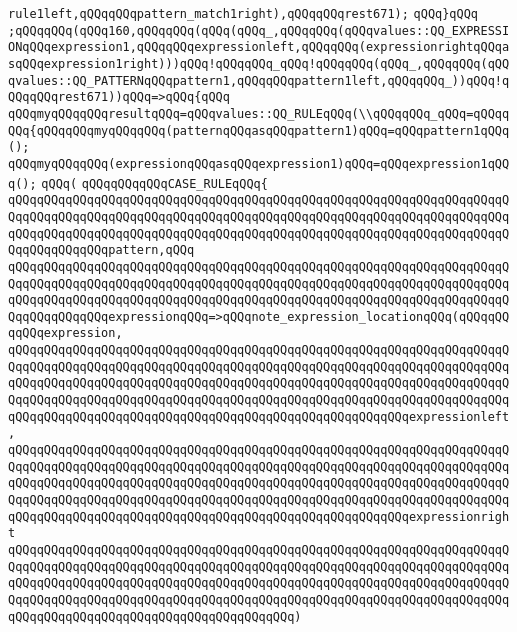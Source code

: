 \verb|rule1left,qQQqqQQqpattern_match1right),qQQqqQQqrest671);|\newline
\verb|qQQq}qQQq|\newline
\verb|;qQQqqQQq(qQQq160,qQQqqQQq(qQQq(qQQq_,qQQqqQQq(qQQqvalues::QQ_EXPRESSIONqQQqexpression1,qQQqqQQqexpressionleft,qQQqqQQq(expressionrightqQQqasqQQqexpression1right)))qQQq!qQQqqQQq_qQQq!qQQqqQQq(qQQq_,qQQqqQQq(qQQqvalues::QQ_PATTERNqQQqpattern1,qQQqqQQqpattern1left,qQQqqQQq_))qQQq!qQQqqQQqrest671))qQQq=>qQQq{qQQq|\newline
\verb|qQQqmyqQQqqQQqresultqQQq=qQQqvalues::QQ_RULEqQQq(\\qQQqqQQq_qQQq=qQQqqQQq{qQQqqQQqmyqQQqqQQq(patternqQQqasqQQqpattern1)qQQq=qQQqpattern1qQQq();|\newline
\verb|qQQqmyqQQqqQQq(expressionqQQqasqQQqexpression1)qQQq=qQQqexpression1qQQq();|\newline
\verb|qQQq(|\newline
\verb|qQQqqQQqqQQqCASE_RULEqQQq{|\newline
\verb|qQQqqQQqqQQqqQQqqQQqqQQqqQQqqQQqqQQqqQQqqQQqqQQqqQQqqQQqqQQqqQQqqQQqqQQqqQQqqQQqqQQqqQQqqQQqqQQqqQQqqQQqqQQqqQQqqQQqqQQqqQQqqQQqqQQqqQQqqQQqqQQqqQQqqQQqqQQqqQQqqQQqqQQqqQQqqQQqqQQqqQQqqQQqqQQqqQQqqQQqqQQqqQQqqQQqqQQqqQQqqQQqpattern,qQQq|\newline
\verb|qQQqqQQqqQQqqQQqqQQqqQQqqQQqqQQqqQQqqQQqqQQqqQQqqQQqqQQqqQQqqQQqqQQqqQQqqQQqqQQqqQQqqQQqqQQqqQQqqQQqqQQqqQQqqQQqqQQqqQQqqQQqqQQqqQQqqQQqqQQqqQQqqQQqqQQqqQQqqQQqqQQqqQQqqQQqqQQqqQQqqQQqqQQqqQQqqQQqqQQqqQQqqQQqqQQqqQQqqQQqqQQqexpressionqQQq=>qQQqnote_expression_locationqQQq(qQQqqQQqqQQqexpression,|\newline
\verb|qQQqqQQqqQQqqQQqqQQqqQQqqQQqqQQqqQQqqQQqqQQqqQQqqQQqqQQqqQQqqQQqqQQqqQQqqQQqqQQqqQQqqQQqqQQqqQQqqQQqqQQqqQQqqQQqqQQqqQQqqQQqqQQqqQQqqQQqqQQqqQQqqQQqqQQqqQQqqQQqqQQqqQQqqQQqqQQqqQQqqQQqqQQqqQQqqQQqqQQqqQQqqQQqqQQqqQQqqQQqqQQqqQQqqQQqqQQqqQQqqQQqqQQqqQQqqQQqqQQqqQQqqQQqqQQqqQQqqQQqqQQqqQQqqQQqqQQqqQQqqQQqqQQqqQQqqQQqqQQqqQQqqQQqqQQqqQQqexpressionleft,|\newline
\verb|qQQqqQQqqQQqqQQqqQQqqQQqqQQqqQQqqQQqqQQqqQQqqQQqqQQqqQQqqQQqqQQqqQQqqQQqqQQqqQQqqQQqqQQqqQQqqQQqqQQqqQQqqQQqqQQqqQQqqQQqqQQqqQQqqQQqqQQqqQQqqQQqqQQqqQQqqQQqqQQqqQQqqQQqqQQqqQQqqQQqqQQqqQQqqQQqqQQqqQQqqQQqqQQqqQQqqQQqqQQqqQQqqQQqqQQqqQQqqQQqqQQqqQQqqQQqqQQqqQQqqQQqqQQqqQQqqQQqqQQqqQQqqQQqqQQqqQQqqQQqqQQqqQQqqQQqqQQqqQQqqQQqqQQqqQQqqQQqexpressionright|\newline
\verb|qQQqqQQqqQQqqQQqqQQqqQQqqQQqqQQqqQQqqQQqqQQqqQQqqQQqqQQqqQQqqQQqqQQqqQQqqQQqqQQqqQQqqQQqqQQqqQQqqQQqqQQqqQQqqQQqqQQqqQQqqQQqqQQqqQQqqQQqqQQqqQQqqQQqqQQqqQQqqQQqqQQqqQQqqQQqqQQqqQQqqQQqqQQqqQQqqQQqqQQqqQQqqQQqqQQqqQQqqQQqqQQqqQQqqQQqqQQqqQQqqQQqqQQqqQQqqQQqqQQqqQQqqQQqqQQqqQQqqQQqqQQqqQQqqQQqqQQqqQQqqQQqqQQqqQQqqQQqqQQq)|\newline
